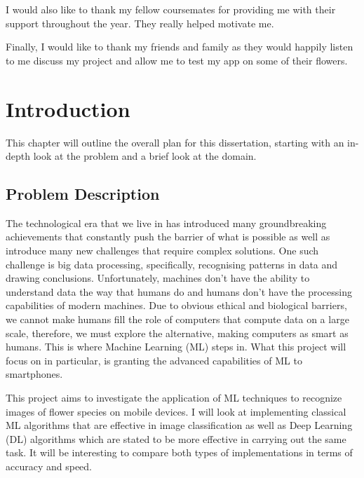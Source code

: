\documentclass[12pt,a4paper]{report}
\begin{document}
I would also like to thank my fellow coursemates for providing me with their support throughout the year. They
really helped motivate me.

\par

Finally, I would like to thank my friends and family as they would happily listen to me discuss my project and allow me
to test my app on some of their flowers.

\clearpage
{}
\chapter{Introduction}

This chapter will outline the overall plan for this dissertation, starting with an in-depth look at the problem and a 
brief look at the domain.

\section{Problem Description}

The technological era that we live in has introduced many groundbreaking achievements that constantly push the barrier 
of what is possible as well as introduce many new challenges that require complex solutions. One such challenge is big 
data processing, specifically, recognising patterns in data and drawing conclusions. Unfortunately, machines don't have 
the ability to understand data the way that humans do and humans don't have the processing capabilities of modern 
machines. Due to obvious ethical and biological barriers, we cannot make humans fill the role of computers that compute 
data on a large scale, therefore, we must explore the alternative, making computers as smart as humans. This is where 
Machine Learning (ML) steps in. What this project will focus on in particular,
is granting the advanced capabilities of ML to smartphones.

\par

This project aims to investigate the application of ML techniques to recognize images of flower species 
on mobile devices. I will look at implementing classical ML algorithms that are effective in image 
classification as well as Deep Learning (DL) algorithms which are stated to be more effective in carrying out the same 
task. It will be interesting to compare both types of implementations in terms of accuracy and speed.

\par
\end{document}
